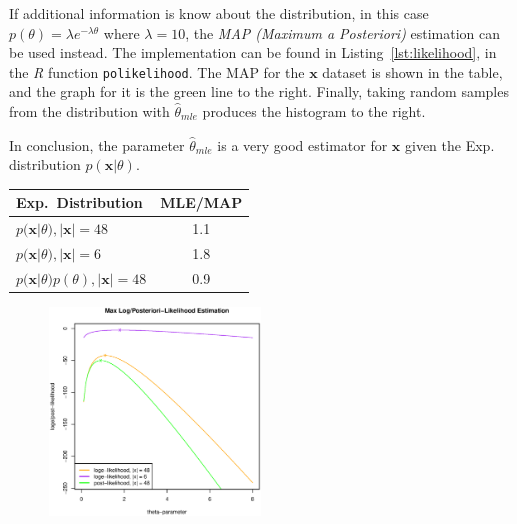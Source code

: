 \documentclass[a4paper, twocolumn]{article}
\begin{document}
    If additional information is know about the distribution, in this case $p(\theta) = \lambda e^{-\lambda \theta}$ where $\lambda=10$, the \emph{MAP (Maximum a Posteriori)} estimation can be used instead. The implementation can be found in Listing~\ref{lst:likelihood}, in the \emph{R} function \texttt{polikelihood}. The MAP for the $\bm{x}$ dataset is shown in the table, and the graph for it is the green line to the right. Finally, taking random samples from the distribution with $\hat{\theta}_{mle}$ produces the histogram to the right.

    In conclusion, the parameter $\hat{\theta}_{mle}$ is a very good estimator for $\bm{x}$ given the Exp. distribution $p(\bm{x} | \theta)$.

    \newpage

    \begin{table}[h!]
    \begin{center}
    \begin{tabular}{lc}
        \toprule
            \textbf{Exp.\ Distribution} & \textbf{MLE/MAP} \\
        \midrule
            $p(\bm{x}|\theta), |\bm{x}|=48$ & 1.1 \\
            $p(\bm{x}|\theta), |\bm{x}|=6$ & 1.8 \\
            $p(\bm{x}|\theta)p(\theta), |\bm{x}|=48$ & 0.9 \\
        \bottomrule
    \end{tabular}
    \end{center}
    \end{table}

    \begin{figure}[h!]
        \centering
        \includegraphics[width=0.5\textwidth]{share/machine.eps}
    \end{figure}
\end{document}
